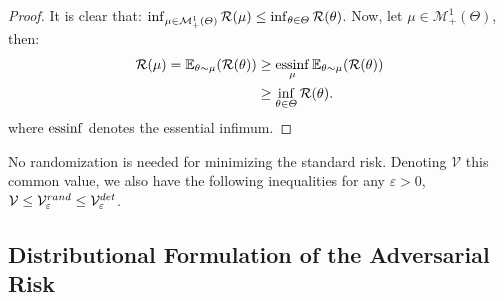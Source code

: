 \begin{proof}
It is clear that:         $\inf_{\mu\in\mathcal{M}^1_+(\Theta)} \mathcal{R}(\mu) \leq \inf_{\theta\in\Theta} \mathcal{R}(\theta)$. Now, let $\mu\in\mathcal{M}^1_+(\Theta)$, then:
\begin{align*}
    \risk(\mu)= \mathbb{E}_{\theta\sim\mu}(\risk(\theta))&\geq \essinf_\mu \mathbb{E}_{\theta\sim\mu} \left(\risk(\theta)\right)\\
    &\geq\inf_{\theta\in\Theta} \risk(\theta).
\end{align*}
where $\operatorname*{essinf}$ denotes the essential infimum.
\end{proof}
\begin{rmq}
No randomization is needed for minimizing the standard risk. Denoting $\mathcal{V}$ this common value, we also have the following inequalities for any $\varepsilon>0$, $\mathcal{V}\leq \mathcal{V}^{rand}_\varepsilon\leq \mathcal{V}^{det}_\varepsilon$.
\end{rmq}



\subsection{Distributional Formulation of the Adversarial Risk} 

